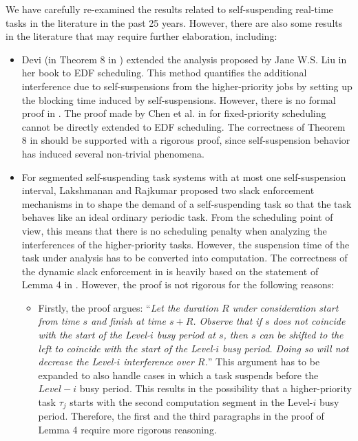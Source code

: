 \label{sec:open-issues-existing}  
We have carefully re-examined the results related to self-suspending
real-time tasks in the literature in the past 25 years. However, there
are also some results in the literature that may require further
elaboration, including:
\begin{itemize}
\item Devi (in Theorem 8 in \cite[Section
  4.5]{DBLP:conf/ecrts/Devi03}) extended the analysis proposed by Jane
  W.S. Liu in her book \cite[Page 164-165]{Liu:2000:RS:518501} to
  EDF scheduling. This method quantifies the additional interference
  due to self-suspensions from the higher-priority jobs by setting up
  the blocking time induced by self-suspensions. However, there
  is no formal proof in \cite{DBLP:conf/ecrts/Devi03}. The proof made
  by Chen et al. in \cite{ChenHuangNelissen,ChenECRTS2016-suspension} for fixed-priority
  scheduling cannot be directly extended to EDF scheduling. The
  correctness of Theorem 8 in \cite[Section
  4.5]{DBLP:conf/ecrts/Devi03} should be supported with a rigorous
  proof, since self-suspension behavior has induced several
  non-trivial phenomena.

\item For segmented self-suspending task systems with at most one
  self-suspension interval, Lakshmanan and Rajkumar proposed two slack
  enforcement mechanisms in \cite{LR:rtas10} to shape the demand of a
  self-suspending task so that the task behaves like an ideal ordinary
  periodic
  task.  From the scheduling point of view, this means that there is
  no scheduling penalty when analyzing the interferences of the
  higher-priority tasks. However, the suspension time of the task under
  analysis has to be converted into computation. The correctness of the dynamic slack
  enforcement in \cite{LR:rtas10} is heavily based on the statement of Lemma
  4 in \cite{LR:rtas10}. However, the proof is not rigorous for the
  following reasons:
  \begin{itemize}
  \item Firstly, the proof argues: ``\emph{Let the duration $R$ under
    consideration start from time $s$ and finish at time $s +
    R$. Observe that if $s$ does not coincide with the start of the
    Level-$i$ busy period at $s$, then $s$ can be shifted to the left
    to coincide with the start of the Level-$i$ busy period. Doing so
    will not decrease the Level-$i$ interference over $R$.}'' This
    argument has to be expanded to also handle cases in which a task
    suspends before the $Level-i$ busy period. This results in the
    possibility that a higher-priority task $\tau_j$ starts with the
    second computation segment in the Level-$i$ busy
    period. Therefore, the first and the third paragraphs in the proof
    of Lemma 4 \cite{LR:rtas10} require more rigorous reasoning.


\end{itemize}
\end{itemize}
